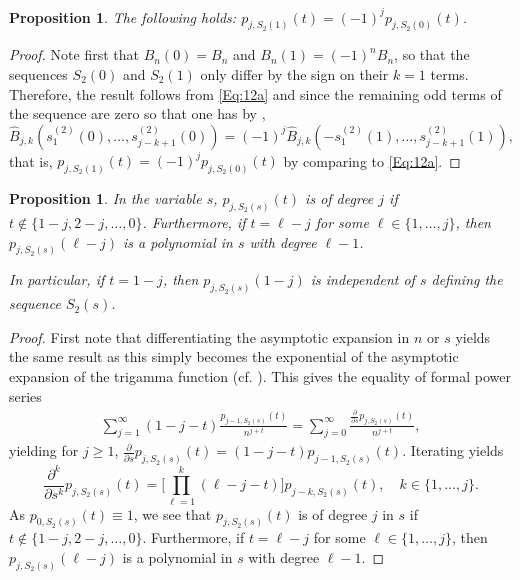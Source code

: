 \documentclass[letterpaper,10pt]{amsart}
\newtheorem{prop}[thm]{Proposition}
\numberwithin{equation}{section}
\begin{document}
\begin{prop}\label{lem5}
The following holds: $p_{j,S_2(1)}(t)=(-1)^j p_{j,S_2(0)}(t)$.
\end{prop}
\begin{proof}
Note first that $B_n(0)=B_n$ and $B_n(1)=(-1)^n B_n$, so that the sequences $S_2(0)$ and $S_2(1)$ only differ by the sign on their $k=1$ terms. Therefore, the result follows from \eqref{Eq:12a} and \cite[Eq. (2.19)]{OS22} since the remaining odd terms of the sequence are zero so that one has by \cite[Eq. (2.19)]{OS22},
\begin{equation}
\widehat{B}_{j,k}(s_1^{(2)}(0),\dots,s_{j-k+1}^{(2)}(0))=(-1)^j \widehat{B}_{j,k}(-s_1^{(2)}(1),\dots,s_{j-k+1}^{(2)}(1)),
\end{equation}
that is, $p_{j,S_2(1)}(t)=(-1)^j p_{j,S_2(0)}(t)$ by comparing to \eqref{Eq:12a}.
\end{proof}

\begin{prop}\label{lem6}
In the variable $s$, $p_{j,S_2(s)}(t)$ is of degree $j$ if $t\notin\{1-j,2-j,\dots,0\}$.
Furthermore, if $t=\ell-j$ for some $\ell\in\{1,\dots,j\}$, then $p_{j,S_2(s)}(\ell-j)$ is a polynomial in $s$ with degree $\ell-1$.

In particular, if $t=1-j$, then $p_{j,S_2(s)}(1-j)$ is independent of $s$ defining the sequence $S_2(s)$.
\end{prop}
\begin{proof}
First note that differentiating the  asymptotic expansion in $n$ or $s$ yields the same result as this simply becomes the exponential of the asymptotic expansion of the trigamma function (cf. \cite[Sect. 5.15]{DLMF}).
This gives the equality of formal power series
\begin{align}
    \sum_{j=1}^\infty (1-j-t)\frac{p_{j-1,S_2(s)}(t)}{n^{j+t}} = \sum_{j=0}^\infty \frac{\frac{\partial}{\partial s}p_{j,S_2(s)}(t)}{n^{j+t}},
\end{align}
yielding for $j\geq1$, $\frac{\partial}{\partial s}p_{j,S_2(s)}(t)=(1-j-t)p_{j-1,S_2(s)}(t).$
Iterating yields
\begin{equation}
\frac{\partial^k}{\partial s^k}p_{j,S_2(s)}(t)=\bigg[\prod_{\ell=1}^{k}(\ell-j-t)\bigg]p_{j-k,S_2(s)}(t),\quad k\in\{1,\dots,j\}.
\end{equation}
As $p_{0,S_2(s)}(t)\equiv 1$, we see that $p_{j,S_2(s)}(t)$ is of degree $j$ in $s$ if $t\notin\{1-j,2-j,\dots,0\}$.
Furthermore, if $t=\ell-j$ for some $\ell\in\{1,\dots,j\}$, then $p_{j,S_2(s)}(\ell-j)$ is a polynomial in $s$ with degree $\ell-1$.
\end{proof}
\end{document}
